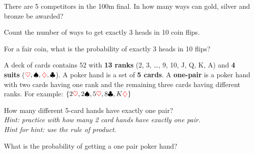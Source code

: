 \documentclass[10pt, a5paper]{scrartcl}
\begin{document}
\boardquestions

\begin{exercise}[Olympics]
	There are 5 competitors in the 100m final. 
	In how many ways can gold, silver and bronze be awarded?
\end{exercise}


\begin{exercise}
	\begin{subex}
		Count the number of ways to get exactly 3 heads in 10 coin flips.
	\end{subex}
	
	\begin{subex}
		For a fair coin, what is the probability of exactly 3 heads in 10 flips?
	\end{subex}
\end{exercise}


\begin{exercise}[Poker]
	A deck of cards contains 52 with \textbf{13 ranks} (2, 3, \ldots, 9, 10, J, Q, K, A) and \textbf{4 suits} ($ {\color{red} \heartsuit}, \spadesuit , {\color{red} \diamondsuit}, \clubsuit $).
	A poker hand is a set of \textbf{5 cards}. A \textbf{one-pair} is a poker hand with two cards having one rank and the remaining three cards having different ranks. 
	For example: $ \{2{\color{red} \heartsuit}, 2\spadesuit, 5{\color{red} \heartsuit}, 8\clubsuit, K{\color{red} \diamondsuit} \}  $

	\begin{subex}
		How many different 5-card hands have exactly one pair? \\
		\emph{Hint: practice with how many 2 card hands have exactly one pair.}\\
		\emph{Hint for hint: use the rule of product.}
	\end{subex}
	
	\begin{subex}	
		What is the probability of getting a one pair poker hand?
	\end{subex}
\end{exercise}



\vfill
{}
\end{document}
